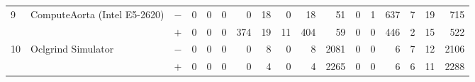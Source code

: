 \begin{tabular}{lll | rrrrrrr | rrrrrrr }
\hline
\multirow{ 2}{*}{9} & \multirow{ 2}{*}{ComputeAorta (Intel E5-2620)} & $-$ & 0 & 0 & 0 & 0 & 18 & 0 & 18       & 51 & 0 & 1 & 637 & 7 & 19 & 715 \\& & $+$ & 0 & 0 & 0 & 374 & 19 & 11 & 404 & 59 & 0 & 0 & 446 & 2 & 15 & 522 \\
\hline
\multirow{ 2}{*}{10} & \multirow{ 2}{*}{Oclgrind Simulator} & $-$ & 0 & 0 & 0 & 0 & 8 & 0 & 8       & 2081 & 0 & 0 & 6 & 7 & 12 & 2106 \\& & $+$ & 0 & 0 & 0 & 0 & 4 & 0 & 4 & 2265 & 0 & 0 & 6 & 6 & 11 & 2288 \\
  \bottomrule
\end{tabular}

